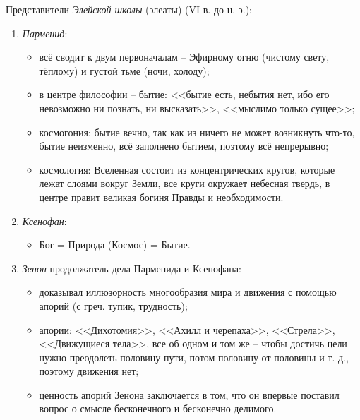 Представители \textit{Элейской школы} (элеаты) (VI в. до н. э.):
\begin{enumerate}
	\item \textit{Парменид}:
	\begin{itemize}
		\item всё сводит к двум первоначалам -- Эфирному огню (чистому свету, тёплому) и густой тьме (ночи, холоду);
		\item в центре философии -- бытие: <<бытие есть, небытия нет, ибо его невозможно ни познать, ни высказать>>, <<мыслимо только сущее>>;
		\item космогония: бытие вечно, так как из ничего не может возникнуть что-то, бытие неизменно, всё заполнено бытием, поэтому всё непрерывно;
		\item космология: Вселенная состоит из концентрических кругов, которые лежат слоями вокруг Земли, все круги окружает небесная твердь, в центре правит великая богиня Правды и необходимости.
	\end{itemize}
	\item \textit{Ксенофан}:
	\begin{itemize}
		\item Бог = Природа (Космос) = Бытие.
	\end{itemize}
	\item \textit{Зенон} продолжатель дела Парменида и Ксенофана:
	\begin{itemize}
		\item доказывал иллюзорность многообразия мира и движения с помощью апорий (с греч. тупик, трудность); 
		\item апории: <<Дихотомия>>, <<Ахилл и черепаха>>, <<Стрела>>, <<Движущиеся тела>>, все об одном и том же -- чтобы достичь цели нужно преодолеть половину пути, потом половину от половины и т. д., поэтому движения нет;
		\item ценность апорий Зенона заключается в том, что он впервые поставил вопрос о смысле бесконечного и бесконечно делимого.
	\end{itemize}
\end{enumerate}

